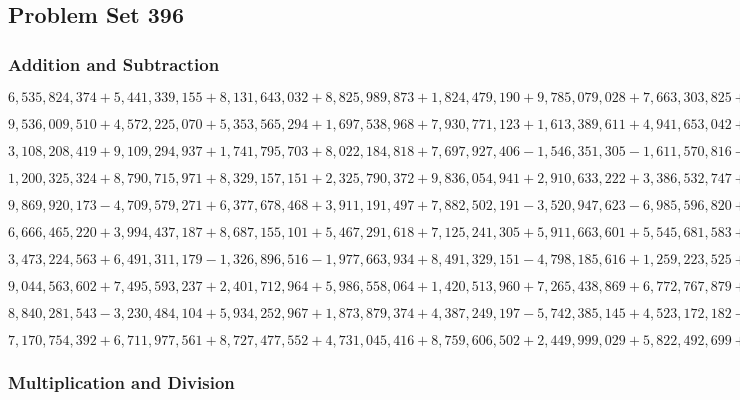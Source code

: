 \hypertarget{problem-set-396}{%
\subsection{Problem Set 396}\label{problem-set-396}}

\hypertarget{addition-and-subtraction}{%
\subsubsection{Addition and
Subtraction}\label{addition-and-subtraction}}

\(6,535,824,374+5,441,339,155+8,131,643,032+8,825,989,873+1,824,479,190+9,785,079,028+7,663,303,825+7,739,482,802+3,133,458,775+9,184,561,402\)

\(9,536,009,510+4,572,225,070+5,353,565,294+1,697,538,968+7,930,771,123+1,613,389,611+4,941,653,042+4,587,706,147+5,431,904,172+2,529,793,198\)

\(3,108,208,419+9,109,294,937+1,741,795,703+8,022,184,818+7,697,927,406-1,546,351,305-1,611,570,816-3,669,744,662-2,712,618,275+4,082,282,268\)

\(1,200,325,324+8,790,715,971+8,329,157,151+2,325,790,372+9,836,054,941+2,910,633,222+3,386,532,747+2,221,275,392+8,179,426,714+3,145,939,975\)

\(9,869,920,173-4,709,579,271+6,377,678,468+3,911,191,497+7,882,502,191-3,520,947,623-6,985,596,820+5,013,174,962+6,010,478,662-6,656,356,195\)

\(6,666,465,220+3,994,437,187+8,687,155,101+5,467,291,618+7,125,241,305+5,911,663,601+5,545,681,583+4,959,972,855+8,312,690,666+8,307,557,769\)

\(3,473,224,563+6,491,311,179-1,326,896,516-1,977,663,934+8,491,329,151-4,798,185,616+1,259,223,525+4,411,555,440-9,390,930,692+9,258,360,043\)

\(9,044,563,602+7,495,593,237+2,401,712,964+5,986,558,064+1,420,513,960+7,265,438,869+6,772,767,879+1,329,869,439+1,977,249,537+3,356,030,342\)

\(8,840,281,543-3,230,484,104+5,934,252,967+1,873,879,374+4,387,249,197-5,742,385,145+4,523,172,182-7,895,398,871+7,950,160,130-2,367,378,814\)

\(7,170,754,392+6,711,977,561+8,727,477,552+4,731,045,416+8,759,606,502+2,449,999,029+5,822,492,699+5,785,695,419+5,002,175,881+7,836,391,090\)

\hypertarget{multiplication-and-division}{%
\subsubsection{Multiplication and
Division}\label{multiplication-and-division}}

